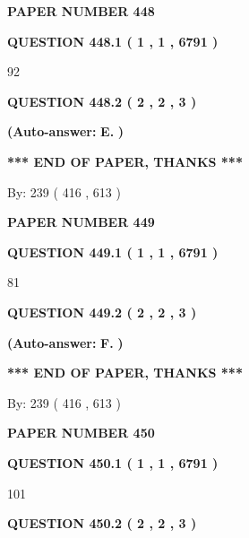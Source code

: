 \documentclass[12pt]{article}
\begin{document}
   
\newpage 
\setcounter{page}{ 
   448001 } 
   
   
 {\textbf{ \Large{ PAPER NUMBER  448  }}}
   
   
   
   
  
  
{\textbf{\large{QUESTION
448.1 
 ( 1 , 1 , 6791 )
}}}

92
  
  
{\textbf{\large{QUESTION
448.2 
 ( 2 , 2 , 3 )
}}}
 
 
{\textbf{(Auto-answer:}}
{\textbf{\large{
E.}}}
{\textbf{)}}
 
 
   
   
   
   
\vspace{1.0in} 
{\textbf{\large{ *** END OF PAPER, THANKS *** }}} 
   
   
\hspace{1.0in} By: 
 239 ( 416 ,  613 )
   
   
   
   
\newpage 
\setcounter{page}{ 
   449001 } 
   
   
 {\textbf{ \Large{ PAPER NUMBER  449  }}}
   
   
   
   
  
  
{\textbf{\large{QUESTION
449.1 
 ( 1 , 1 , 6791 )
}}}

81
  
  
{\textbf{\large{QUESTION
449.2 
 ( 2 , 2 , 3 )
}}}
 
 
{\textbf{(Auto-answer:}}
{\textbf{\large{
F.}}}
{\textbf{)}}
 
 
   
   
   
   
\vspace{1.0in} 
{\textbf{\large{ *** END OF PAPER, THANKS *** }}} 
   
   
\hspace{1.0in} By: 
 239 ( 416 ,  613 )
   
   
   
   
\newpage 
\setcounter{page}{ 
   450001 } 
   
   
 {\textbf{ \Large{ PAPER NUMBER  450  }}}
   
   
   
   
  
  
{\textbf{\large{QUESTION
450.1 
 ( 1 , 1 , 6791 )
}}}

101
  
  
{\textbf{\large{QUESTION
450.2 
 ( 2 , 2 , 3 )
}}}
 
\end{document}
